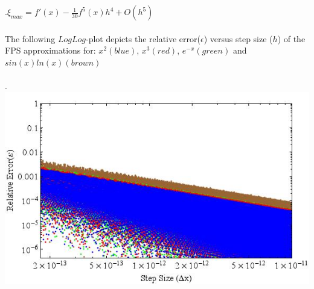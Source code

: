 \documentclass{report}
\begin{document}
\begin{enumerate}
\\
\\.\hspace{25 mm}$\xi_{max} = f'(x)-\frac{1}{30}f^5(x)h^4+O(h^5)$
\\\\The following $LogLog$-plot depicts the relative error($\epsilon$) versus step size ($h$) of the FPS approximations for: $x^2(blue)$, $x^3(red)$, $e^{-x}(green)$ and $sin(x)ln(x)(brown)$
\\\\.\hspace{6 mm} \includegraphics[scale=.5]{fivePoint.jpeg}
\end{enumerate}
\end{document}
